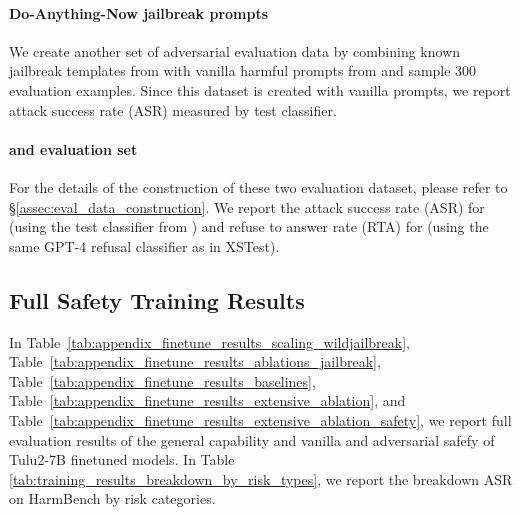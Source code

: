 \paragraph{Do-Anything-Now jailbreak prompts} 
We create another set of adversarial evaluation data by combining known jailbreak templates from \dan \cite{doanytingnow} with vanilla harmful prompts from \harmbench and sample 300 evaluation examples. Since this dataset is created with \harmbench vanilla prompts, we report attack success rate (ASR) measured by \harmbench test classifier.

\paragraph{\dataset \advh and \advb evaluation set} 

For the details of the construction of these two evaluation dataset, please refer to \S \ref{assec:eval_data_construction}. We report the attack success rate (ASR) for \advh (using the test classifier from \harmbench) and refuse to answer rate (RTA) for \advb (using the same GPT-4 refusal classifier as in XSTest).

\subsection{Full Safety Training Results}
\label{assec:safety_training_full_results}
In Table~\ref{tab:appendix_finetune_results_scaling_wildjailbreak}, Table~\ref{tab:appendix_finetune_results_ablations_jailbreak}, Table~\ref{tab:appendix_finetune_results_baselines}, Table~\ref{tab:appendix_finetune_results_extensive_ablation}, and Table~\ref{tab:appendix_finetune_results_extensive_ablation_safety}, we report full evaluation results of the general capability and vanilla and adversarial safefy of Tulu2-7B finetuned models. In Table \ref{tab:training_results_breakdown_by_risk_types}, we report the breakdown ASR on HarmBench by risk categories.











